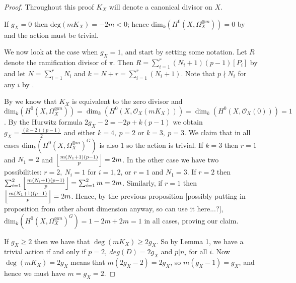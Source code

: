\documentclass[11pt]{article} %
\begin{document}
\begin{proof}

Throughout this proof $K_X$ will denote a canonical divisor on $X$.

If $g_X=0$ then $\mbox{deg}(mK_X)=-2m<0$; hence $\mbox{dim}_k(H^0(X,\Omega_X^{\otimes m}))=0$ by \citep[prop. 3, {\S}8]{fulton} and the action must be trivial.

We now look at the case when $g_X=1$, and start by setting some notation. Let $R$ denote the ramification divisor of $\pi$. Then $R=\sum_{i=1}^r(N_i+1)(p-1)[P_i]$ by \citep[Prop. 4, {\S}1, Ch. IV]{localfields} and let $N=\sum_{i=1}^rN_i$ and $k=N+r=\sum_{i=1}^r(N_i+1)$. Note that $p\nmid N_i$ for any $i$ by \citep[Lem. 1, pg. 87]{naka}.

By \citep[Chap. IV,\ Example 1.3.6]{hart} we know that $K_X$ is equivalent to the zero divisor and $\mbox{dim}_k(H^0(X,\Omega_X^{\otimes m}))=\dim_k(H^0(X,\mathscr{O}_X(mK_X)))=\dim_k(H^0(X,\mathscr{O}_X(0)))=1$.  By the Hurwitz formula $2g_X-2=-2p+k(p-1)$ we obtain $g_X=\frac{(k-2)(p-1)}{2}$ and either $k=4,\ p=2$ or $k=3,\ p=3$. We claim that in all cases $\mbox{dim}_k(H^0(X,\Omega_X^{\otimes m})^G)$ is also $1$ so the action is trivial. If $k=3$ then $r=1$ and $N_1=2$ and $\Big{\lfloor}\frac{m(N_1+1)(p-1)}{p}\Big{\rfloor}=2m$. 
In the other case we have two possibilities: $r=2,\ N_i=1$ for $i=1,2$, or $r=1$ and $N_1=3$. If $r=2$ then $\sum_{i=1}^2\Big{\lfloor}\frac{m(N_i+1)(p-1)}{p}\Big{\rfloor}=\sum_{i=1}^2m=2m$.
Similarly, if $r=1$ then $\Big{\lfloor}\frac{m(N_1+1)(p-1)}{p}\Big{\rfloor}=2m$. Hence, by the previous proposition [possibly putting in proposition from other  about dimension anyway, so can use it here...?], $\mbox{dim}_k(H^0(X,\Omega_X^{\otimes m})^G)=1-2m+2m=1$ in all cases, proving our claim. 

If $g_X\geq 2$ then we have that $\deg(mK_X)\geq 2g_X$. So by Lemma 1, we have a trivial action if and only if $p=2,\ deg(D)=2g_X$ and $p|n_i$ for all $i$. Now $\deg(mK_X)=2g_X$ means that $m(2g_X-2)=2g_X$, so $m(g_X-1)=g_X$, and hence we must have $m=g_X=2$.
\end{proof}




\end{document}
